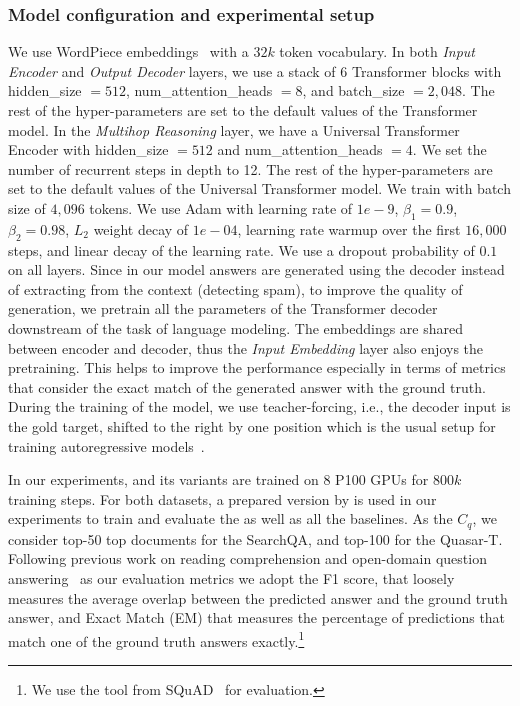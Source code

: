 \subsubsection{Model configuration and experimental setup}
We use WordPiece embeddings~\citep{wu:2016:google} with a $32k$ token vocabulary. 
%
In both \emph{Input Encoder} and \emph{Output Decoder} layers, we use 
a stack of 6 Transformer blocks with hidden\_size $= 512$, num\_attention\_heads $=8$, and batch\_size $=2,048$. 
The rest of the hyper-parameters are set to the default values of the Transformer model.
%
In the \emph{Multihop Reasoning} layer, we have a Universal Transformer Encoder with hidden\_size $=512$ and num\_attention\_heads $=4$. 
We set the number of recurrent steps in depth to 12. The rest of the hyper-parameters are set to the default values of the Universal Transformer model.
%
We train with batch size of $4,096$ tokens. We use Adam with learning rate of $1e-9$, $\beta_1 = 0.9$, $\beta_2 = 0.98$, $L_2$ weight decay of $1e-04$, learning rate warmup over the first $16,000$ steps, and linear decay of the learning rate. 
We use a dropout probability of $0.1$ on all layers.
%
Since in our model answers are generated using the decoder instead of extracting from the context (detecting spam), to improve the quality of generation, we pretrain all the parameters of the Transformer decoder downstream of the task of language modeling. The embeddings are shared between encoder and decoder, thus the \emph{Input Embedding} layer also enjoys the pretraining. This helps to improve the performance especially in terms of metrics that consider the exact match of the generated answer with the ground truth.
%
During the training of the model, we use teacher-forcing, i.e., the decoder input is the gold target, shifted to the right by one position which is the usual setup for training autoregressive models~\citep{williams1989learning}. 

In our experiments, \tracrnet and its variants are trained on 8 P100 GPUs for $800k$ training steps.
%
For both datasets, a prepared version by \citet{wang2017r} is used in our experiments to train and evaluate the \tracrnet as well as all the baselines. As the $C_q$, we consider top-50 top documents for the SearchQA, and top-100 for the Quasar-T.
%
Following previous work on reading comprehension and open-domain question answering~\citep{shen2017reasonet,buck2017ask,wang2017r,wang2017evidence,lin2018denoising} as our evaluation metrics we adopt the F1 score, that loosely measures the average overlap between the predicted answer and the ground truth answer, and Exact Match (EM) that measures the percentage of predictions that match one of the ground truth answers exactly.\footnote{We use the tool from SQuAD~\citep{rajpurkar2016squad} for evaluation.} 

